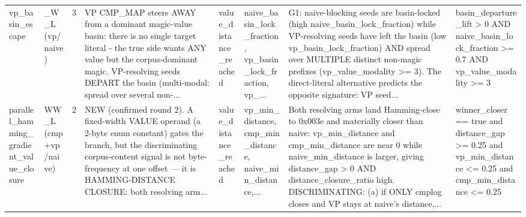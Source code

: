 \documentclass[7pt]{extarticle}
\begin{document}
{\begin{longtable}{@{}p{2.4cm}p{1.9cm}rp{4.3cm}p{1.5cm}p{1.7cm}p{4.6cm}p{3.0cm}@{}}
vp\_\allowbreak basin\_\allowbreak escape & \_\allowbreak W\_\allowbreak L (vp/naive) & 3 & VP CMP\_\allowbreak MAP steers AWAY from a dominant magic-value basin: there is no single target literal - the true side wants ANY value but the corpus-dominant magic. VP-resolving seeds DEPART the basin (multi-modal: spread over several non-... & value\_\allowbreak distance\_\allowbreak reached & naive\_\allowbreak basin\_\allowbreak lock\_\allowbreak fraction, vp\_\allowbreak basin\_\allowbreak lock\_\allowbreak fraction, vp\_\allowbreak ... & G1: naive-blocking seeds are basin-locked (high naive\_\allowbreak basin\_\allowbreak lock\_\allowbreak fraction) while VP-resolving seeds have left the basin (low vp\_\allowbreak basin\_\allowbreak lock\_\allowbreak fraction) AND spread over MULTIPLE distinct non-magic prefixes (vp\_\allowbreak value\_\allowbreak modality \textgreater{}= 3). The direct-literal alternative predicts the opposite signature: VP seed... & basin\_\allowbreak departure\_\allowbreak lift \textgreater{} 0 AND naive\_\allowbreak basin\_\allowbreak lock\_\allowbreak fraction \textgreater{}= 0.7 AND vp\_\allowbreak value\_\allowbreak modality \textgreater{}= 3\\
parallel\_\allowbreak hamming\_\allowbreak gradient\_\allowbreak value\_\allowbreak closure & WW\_\allowbreak L (cmp+vp/naive) & 2 & NEW (confirmed round 2). A fixed-width VALUE operand (a 2-byte enum constant) gates the branch, but the discriminating corpus-content signal is not byte-frequency at one offset — it is HAMMING-DISTANCE CLOSURE: both resolving arm... & value\_\allowbreak distance\_\allowbreak reached & vp\_\allowbreak min\_\allowbreak distance, cmp\_\allowbreak min\_\allowbreak distance, naive\_\allowbreak min\_\allowbreak distance,... & Both resolving arms land Hamming-close to 0x003e and materially closer than naive: vp\_\allowbreak min\_\allowbreak distance and cmp\_\allowbreak min\_\allowbreak distance are near 0 while naive\_\allowbreak min\_\allowbreak distance is larger, giving distance\_\allowbreak gap \textgreater{} 0 AND distance\_\allowbreak closure\_\allowbreak ratio high. DISCRIMINATING: (a) if ONLY cmplog closes and VP stays at naive's distance,... & winner\_\allowbreak closer == true and distance\_\allowbreak gap \textgreater{}= 0.25 and vp\_\allowbreak min\_\allowbreak distance \textless{}= 0.25 and cmp\_\allowbreak min\_\allowbreak distance \textless{}= 0.25\\

\end{longtable}}
\end{document}
